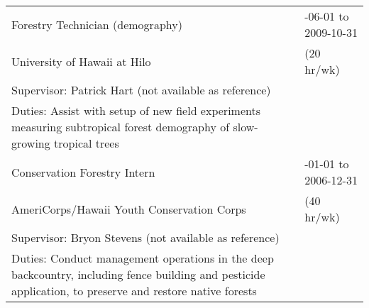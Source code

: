 \documentclass[10pt,english]{article}
\providecommand{\tabularnewline}{\\}
\begin{document}
\begin{tabularx}{\textwidth}{@{}>{\raggedright}p{4.5in} >{\raggedleft}X@{}}
Forestry Technician (demography) & 2009-06-01 to 2009-10-31 \tabularnewline
\addtolength{\leftskip}{5ex} University of Hawaii at Hilo & (20 hr/wk) \tabularnewline
\addtolength{\leftskip}{5ex}Supervisor: Patrick Hart (not available as reference) & \tabularnewline
\addtolength{\leftskip}{5ex}Duties: Assist with setup of new field experiments measuring subtropical forest demography of slow-growing tropical trees & \tabularnewline

Conservation Forestry Intern & 2006-01-01 to 2006-12-31 \tabularnewline
\addtolength{\leftskip}{5ex} AmeriCorps/Hawaii Youth Conservation Corps & (40 hr/wk) \tabularnewline
\addtolength{\leftskip}{5ex}Supervisor: Bryon Stevens (not available as reference) & \tabularnewline
\addtolength{\leftskip}{5ex}Duties: Conduct management operations in the deep backcountry, including fence building and pesticide application, to preserve and restore native forests & \tabularnewline

\end{tabularx}

\vspace{1ex}

%
%


%
%
%
%
\end{document}
